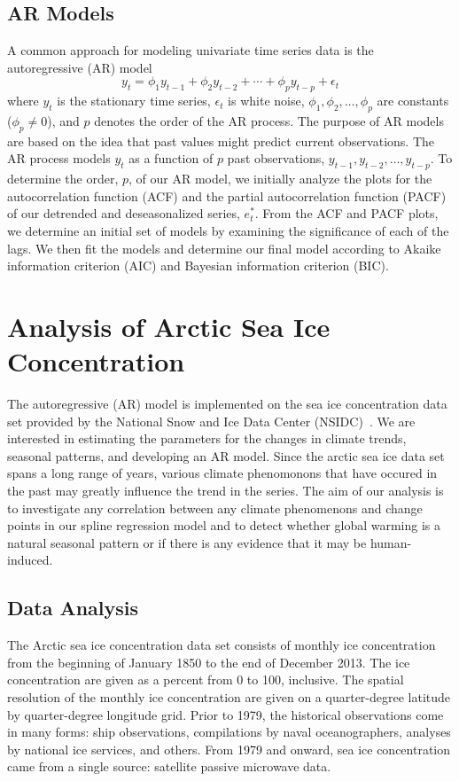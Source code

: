 \documentclass[12pt]{article}
\begin{document}
\subsection{AR Models}
A common approach for modeling univariate time series data is the autoregressive (AR) model
$$y_t = \phi_{1}y_{t-1} + \phi_{2}y_{t-2} + \cdots + \phi_{p}y_{t-p} + \epsilon_t$$
where $y_t$ is the stationary time series, $\epsilon_t$ is white noise, $\phi_1, \phi_2, \dots, \phi_p$ are constants ($\phi_p \neq 0$), and $p$ denotes the order of the AR process. The purpose of AR models are based on the idea that past values might predict current observations. The AR process models $y_t$ as a function of $p$ past observations, $y_{t-1}, y_{t-2}, \dots, y_{t-p}$. To determine the order, $p$, of our AR model, we initially analyze the plots for the autocorrelation function (ACF) and the partial autocorrelation function (PACF) of our detrended and deseasonalized series, $e^{*}_{t}$. From the ACF and PACF plots, we determine an initial set of models by examining the significance of each of the lags. We then fit the models and determine our final model according to Akaike information criterion (AIC) and Bayesian information criterion (BIC).


\section{Analysis of Arctic Sea Ice Concentration}
The autoregressive (AR) model is implemented on the sea ice concentration data set provided by the National Snow and Ice Data Center (NSIDC)~\citep{data}. We are interested in estimating the parameters for the changes in climate trends, seasonal patterns, and developing an AR model. Since the arctic sea ice data set spans a long range of years, various climate phenomonons that have occured in the past may greatly influence the trend in the series. The aim of our analysis is to investigate any correlation between any climate phenomenons and change points in our spline regression model and to detect whether global warming is a natural seasonal pattern or if there is any evidence that it may be human-induced.

\subsection{Data Analysis}
The Arctic sea ice concentration data set consists of monthly ice concentration from the beginning of January 1850 to the end of December 2013. The ice concentration are given as a percent from 0 to 100, inclusive. The spatial resolution of the monthly ice concentration are given on a quarter-degree latitude by quarter-degree longitude grid. Prior to 1979, the historical observations come in many forms: ship observations, compilations by naval oceanographers, analyses by national ice services, and others. From 1979 and onward, sea ice concentration came from a single source: satellite passive microwave data.
\end{document}
